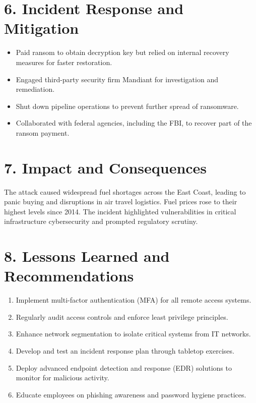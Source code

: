 \documentclass[11pt]{article}
\begin{document}
\section*{6. Incident Response and Mitigation}
\begin{itemize}[leftmargin=*]
    \item Paid ransom to obtain decryption key but relied on internal recovery measures for faster restoration.
    \item Engaged third-party security firm Mandiant for investigation and remediation.
    \item Shut down pipeline operations to prevent further spread of ransomware.
    \item Collaborated with federal agencies, including the FBI, to recover part of the ransom payment.
\end{itemize}

\section*{7. Impact and Consequences}
The attack caused widespread fuel shortages across the East Coast, leading to panic buying and disruptions in air travel logistics. Fuel prices rose to their highest levels since 2014. The incident highlighted vulnerabilities in critical infrastructure cybersecurity and prompted regulatory scrutiny.

\section*{8. Lessons Learned and Recommendations}
\begin{enumerate}[leftmargin=*]
    \item Implement multi-factor authentication (MFA) for all remote access systems.
    \item Regularly audit access controls and enforce least privilege principles.
    \item Enhance network segmentation to isolate critical systems from IT networks.
    \item Develop and test an incident response plan through tabletop exercises.
    \item Deploy advanced endpoint detection and response (EDR) solutions to monitor for malicious activity.
    \item Educate employees on phishing awareness and password hygiene practices.
\end{enumerate}
\end{document}
